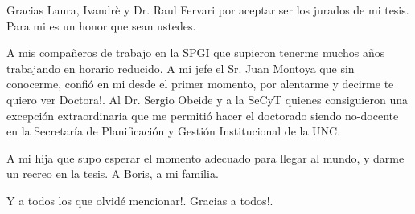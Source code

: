 {Gracias Laura, Ivandr\`e y Dr. Raul Fervari por aceptar ser los jurados de mi tesis. Para mi es un honor que sean ustedes.

A mis compa\~neros de trabajo en la SPGI que supieron tenerme muchos a\~nos trabajando en horario reducido. A mi jefe el Sr. Juan Montoya que sin conocerme, confi\'o en mi desde el primer momento, por alentarme y decirme te quiero ver Doctora!. Al Dr. Sergio Obeide y a la SeCyT quienes consiguieron una excepci\'on extraordinaria que me permiti\'o hacer el doctorado siendo no-docente en la Secretar\'ia de Planificaci\'on y Gesti\'on Institucional de la UNC.

A mi hija que supo esperar el momento adecuado para llegar al mundo, y darme un recreo en la tesis. A Boris, a mi familia.

Y a todos los que olvid\'e mencionar!. Gracias a todos!.
}

\vspace{\fill}
